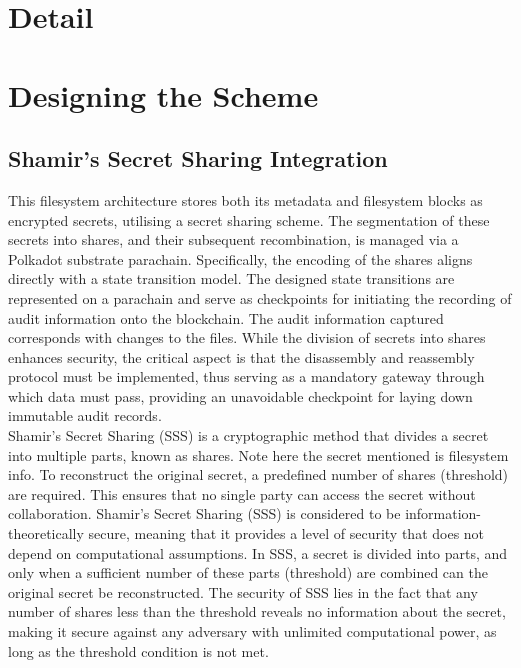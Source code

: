 \documentclass{tufte-handout}
\begin{document}
\section{Detail}

\section{Designing the Scheme}
\subsection{Shamir's Secret Sharing Integration}
This filesystem architecture stores both its metadata and filesystem blocks as encrypted secrets, utilising a secret sharing scheme. The segmentation of these secrets
into shares, and their subsequent recombination, is managed via a Polkadot substrate parachain. Specifically, the encoding of the shares aligns directly with a
state transition model. The designed state transitions are represented on a parachain and serve as checkpoints for initiating the recording of audit information
onto the blockchain. The audit information captured corresponds with changes to the files. While the division of secrets into shares enhances security, the critical
aspect is that the disassembly and reassembly protocol must be implemented, thus serving as a mandatory gateway through which data must pass, providing an
unavoidable checkpoint for laying down immutable audit records.\\
\vspace{10pt}
Shamir's Secret Sharing (SSS) is a cryptographic method that divides a secret into multiple parts, known as shares. Note here the secret mentioned is filesystem info.
To reconstruct the original secret, a predefined number of shares (threshold) are required. This ensures that no single party can access the secret without collaboration.
Shamir's Secret Sharing (SSS) is considered to be information-theoretically secure, meaning that it provides a level of security that does not depend
on computational assumptions. In SSS, a secret is divided into parts, and only when a sufficient number of these parts (threshold) are combined can
the original secret be reconstructed. The security of SSS lies in the fact that any number of shares less than the threshold reveals no information
about the secret, making it secure against any adversary with unlimited computational power, as long as the threshold condition is not met.\\
\vspace{10pt}
\end{document}
